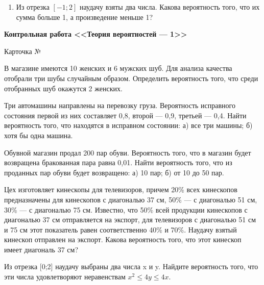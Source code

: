 \documentclass[a4paper,14pt]{extarticle}
\newcounter{ncard}
\newcommand{\num}{\refstepcounter{ncard}\arabic{ncard}}
\begin{document}
\begin{LOOP}{10}
\begin{enumerate}
\item 
Из отрезка $[-1;2]$ наудачу взяты два числа. Какова вероятность того, что их сумма больше 1, а произведение меньше 1?


\end{enumerate}


\vspace{2cm}
\begin{enumerate}
{\item[]\centering \bfseries  Контрольная работа <<Теория вероятностей --- 1>> \par\vspace{1mm} Карточка № \num\par\vspace{1mm}}

\item 
В магазине имеются 10 женских и 6 мужских шуб. Для анализа качества отобрали три шубы случайным образом. Определить
вероятность того, что среди отобранных шуб окажутся 2 женских.

\item 
Три автомашины направлены на перевозку груза. Вероятность исправного состояния первой из них составляет 0,8, второй ---
0,9, третьей --- 0,4. Найти вероятность того, что находятся в исправном состоянии: а) все три машины; б) хотя бы одна
машина.

\item 
Обувной магазин продал 200 пар обуви. Вероятность того, что в магазин будет возвращена бракованная пара равна 0,01.
Найти вероятность того, что из проданных пар обуви будет возвращено: а) 10 пар; б) от 10 до 50 пар.

\item 
Цех изготовляет кинескопы для телевизоров, причем 20\% всех кинескопов предназначены для кинескопов с диагональю 37
см, 50\% --- с диагональю 51 см, 30\% --- с диагональю 75 см. Известно, что 50\% всей продукции кинескопов с диагональю 37
см отправляется на экспорт, для телевизоров с диагональю 51 см и 75 см этот показатель равен соответственно 40\% и
70\%. Наудачу взятый кинескоп отправлен на экспорт. Какова вероятность того, что этот кинескоп имеет диагональ 37 см?

\item 
Из отрезка [0;2] наудачу выбраны два числа x и y. Найдите вероятность того, что эти числа удовлетворяют неравенствам 
$x^2\leqslant 4y\leqslant 4x$.
\end{enumerate}
\newpage
\end{LOOP}
\end{document}
